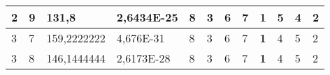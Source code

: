 \documentclass[conference]{IEEEtran}
\begin{document}
\begin{table*}[]
\begin{tabular}{|llll|llllllll|}
\multicolumn{1}{|l|}{2}                                                              & \multicolumn{1}{l|}{9}                                                                 & \multicolumn{1}{l|}{131,8}                                                                 & 2,6434E-25                              & \multicolumn{1}{l|}{8}                                                           & \multicolumn{1}{l|}{3}                                                           & \multicolumn{1}{l|}{6}                                                           & \multicolumn{1}{l|}{7}                                                           & \multicolumn{1}{l|}{\textbf{1}}                                                  & \multicolumn{1}{l|}{5}                                                           & \multicolumn{1}{l|}{4}                                                           & 2                                   \\ \hline
\multicolumn{1}{|l|}{3}                                                              & \multicolumn{1}{l|}{7}                                                                 & \multicolumn{1}{l|}{159,2222222}                                                           & 4,676E-31                               & \multicolumn{1}{l|}{8}                                                           & \multicolumn{1}{l|}{3}                                                           & \multicolumn{1}{l|}{6}                                                           & \multicolumn{1}{l|}{7}                                                           & \multicolumn{1}{l|}{\textbf{1}}                                                  & \multicolumn{1}{l|}{4}                                                           & \multicolumn{1}{l|}{5}                                                           & 2                                   \\ \hline
\multicolumn{1}{|l|}{3}                                                              & \multicolumn{1}{l|}{8}                                                                 & \multicolumn{1}{l|}{146,1444444}                                                           & 2,6173E-28                              & \multicolumn{1}{l|}{8}                                                           & \multicolumn{1}{l|}{3}                                                           & \multicolumn{1}{l|}{6}                                                           & \multicolumn{1}{l|}{7}                                                           & \multicolumn{1}{l|}{\textbf{1}}                                                  & \multicolumn{1}{l|}{4}                                                           & \multicolumn{1}{l|}{5}                                                           & 2                                   \\ \hline

\end{tabular}
\end{table*}
\end{document}
